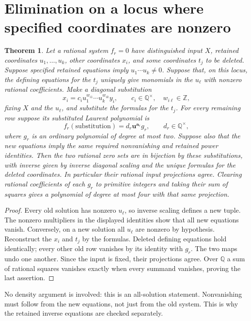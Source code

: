 \documentclass[11pt,a4paper]{article}
\newtheorem{theorem}{Theorem}[section]\newtheorem{lemma}[theorem]{Lemma}\newtheorem{proposition}[theorem]{Proposition}\newtheorem{corollary}[theorem]{Corollary}
\newcommand{\Q}{\mathbb Q}\newcommand{\Z}{\mathbb Z}\newcommand{\Nm}{\operatorname{N}}
\begin{document}
\section{Elimination on a locus where specified coordinates are nonzero}
\begin{theorem}\label{thm:general}
Let a rational system $f_r=0$ have distinguished input $X$, retained
coordinates $u_1,\ldots,u_k$, other coordinates $x_i$, and some coordinates
$t_j$ to be deleted. Suppose specified retained equations imply
$u_1\cdots u_k\ne0$. Suppose that, on this locus, the defining equations
for the $t_j$ uniquely give monomials in the $u_\ell$ with nonzero rational
coefficients. Make a diagonal substitution
\[
 x_i=c_i u_1^{w_{i1}}\cdots u_k^{w_{ik}}y_i,
 \qquad c_i\in\Q^\times,\quad w_{i\ell}\in\Z,
\]
fixing $X$ and the $u_\ell$, and substitute the formulas for the $t_j$.
For every remaining row suppose its substituted Laurent polynomial is
\[
 f_r(\text{substitution})=d_r\boldsymbol u^{\boldsymbol a_r}g_r,
 \qquad d_r\in\Q^\times,
\]
where $g_r$ is an ordinary polynomial of degree at most two. Suppose also
that the new equations imply the same required nonvanishing and retained
power identities. Then the two rational zero sets are in bijection by
these substitutions, with inverse given by inverse diagonal scaling and
the unique formulas for the deleted coordinates. In particular their
rational input projections agree. Clearing rational coefficients of each
$g_r$ to primitive integers and taking their sum of squares gives a
polynomial of degree at most four with that same projection.
\end{theorem}
\begin{proof}
Every old solution has nonzero $u_\ell$, so inverse scaling defines a
new tuple. The nonzero multipliers in the displayed identities show that
all new equations vanish. Conversely, on a new solution all $u_\ell$ are
nonzero by hypothesis. Reconstruct the $x_i$ and $t_j$ by the formulas.
Deleted defining equations hold identically; every other old row vanishes
by its identity with $g_r$. The two maps undo one another. Since the input
is fixed, their projections agree. Over $\Q$ a sum of rational squares
vanishes exactly when every summand vanishes, proving the last assertion.
\end{proof}

No density argument is involved: this is an all-solution statement.
Nonvanishing must follow from the new equations, not just from the old
system. This is why the retained inverse equations are checked separately.
\end{document}
